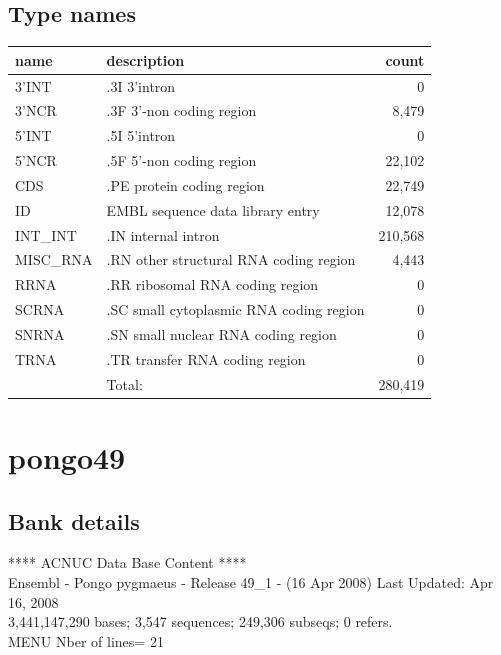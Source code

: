 \documentclass{article}
\begin{document}
\begin{Schunk}
\subsection{Type names}
\noindent\begin{tabular}{llr}
\hline \hline
name & description & count \\
\hline
3'INT  &  .3I 3'intron  &  0 \\
3'NCR  &  .3F  3'-non coding region  &  8,479 \\
5'INT  &  .5I 5'intron  &  0 \\
5'NCR  &  .5F  5'-non coding region  &  22,102 \\
CDS  &  .PE protein coding region  &  22,749 \\
ID  &  EMBL sequence data library entry  &  12,078 \\
INT\_INT  &  .IN  internal intron  &  210,568 \\
MISC\_RNA  &  .RN other structural RNA coding region  &  4,443 \\
RRNA  &  .RR ribosomal RNA coding region  &  0 \\
SCRNA  &  .SC small cytoplasmic RNA coding region  &  0 \\
SNRNA  &  .SN small nuclear RNA coding region  &  0 \\
TRNA  &  .TR transfer RNA coding region  &  0 \\
\hline
 & Total: & 280,419 \\
\hline \hline
\end{tabular}

\section{ pongo49 }
\subsection{Bank details}
             ****     ACNUC Data Base Content      ****                         \\
Ensembl - Pongo pygmaeus - Release 49\_1 - (16 Apr 2008) Last Updated: Apr 16, 2008\\
3,441,147,290 bases; 3,547 sequences; 249,306 subseqs; 0 refers.\\
MENU Nber of lines= 21                                                         


\end{Schunk}
\end{document}
